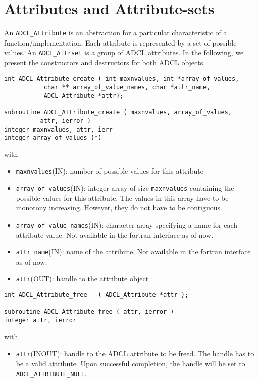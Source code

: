 \section{Attributes and Attribute-sets}

An {\tt ADCL\_Attribute} is an abstraction for a particular characteristic of
a function/implementation. Each attribute is represented by a set of possible
values.  An {\tt ADCL\_Attrset} is a group of ADCL attributes.  In the
following, we present the constructors and destructors for both ADCL objects.

\begin{verbatim}
int ADCL_Attribute_create ( int maxnvalues, int *array_of_values, 
           char ** array_of_value_names, char *attr_name, 
           ADCL_Attribute *attr);

subroutine ADCL_Attribute_create ( maxnvalues, array_of_values, 
          attr, ierror )
integer maxnvalues, attr, ierr
integer array_of_values (*)
\end{verbatim}
with
\begin{itemize}
\item {\tt maxnvalues}(IN): number of possible values for this attribute
\item {\tt array\_of\_values}(IN): integer array of size {\tt maxnvalues} containing the possible values for this 
  attribute. The values in this array have to be monotony increasing. However, they do not have to be contiguous.
\item {\tt array\_of\_value\_names}(IN): character array specifying a name for
  each attribute value. Not available in the fortran interface as of now.
\item {\tt attr\_name}(IN): name of the attribute. Not available in the
  fortran interface as of now.
\item {\tt attr}(OUT): handle to the attribute object
\end{itemize} 	

\hspace{1cm}
\begin{verbatim}
int ADCL_Attribute_free   ( ADCL_Attribute *attr );

subroutine ADCL_Attribute_free ( attr, ierror )
integer attr, ierror
\end{verbatim}
with
\begin{itemize}
\item {\tt attr}(INOUT): handle to the ADCL attribute to be freed. The handle has to be a valid attribute.
    	Upon successful completion, the handle will be set to {\tt ADCL\_ATTRIBUTE\_NULL}.
\end{itemize}


